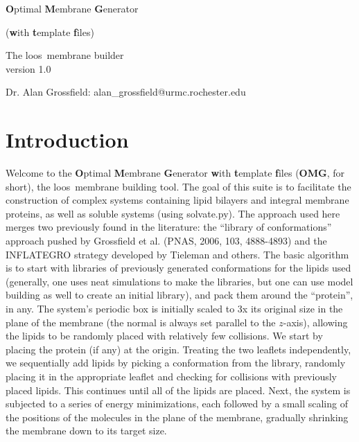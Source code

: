 \documentclass[12pt]{article}
\begin{document}
\newcommand{\loos}{{\sc loos}}
\newcommand{\pyloos}{{\sc PyLoos}}
\newcommand{\namd}{{\sc namd}}
\newcommand{\psfgen}{{\tt psfgen}}
\newcommand{\omgwtf}{{\bf OMG}}
\newcommand{\highlight}[1]{\textcolor{red}{#1}}


\begin{center}
\begin{LARGE}
{\bf O}ptimal {\bf M}embrane {\bf G}enerator \\
\end{LARGE}
\begin{Large}
({\bf w}ith  {\bf t}emplate {\bf f}iles) \\
\end{Large}
\vspace*{0.25in}
\begin{large}
The \loos\ membrane builder \\
version 1.0 \\
\end{large}

\vspace*{0.5in}
Dr. Alan Grossfield: alan\_grossfield@urmc.rochester.edu \\
\end{center}

\newpage

\tableofcontents
\newpage

\section{Introduction}
\label{s:intro}

Welcome to the {\bf O}ptimal {\bf M}embrane {\bf G}enerator {\bf w}ith {\bf
t}emplate {\bf f}iles (\omgwtf, for short), the \loos\ membrane building tool.
The goal of this suite is to facilitate the construction of complex systems
containing lipid bilayers and integral membrane proteins, as well as soluble
systems (using solvate.py).  The approach used here merges two previously found in the literature:
the ``library of conformations'' approach pushed by Grossfield et al. (PNAS,
2006, 103, 4888-4893) and the INFLATEGRO strategy developed by Tieleman and
others.  The basic algorithm is to start with libraries of previously generated
conformations for the lipids used (generally, one uses neat simulations to make
the libraries, but one can use model building as well to create an initial
library), and pack them around the ``protein'', in any.  The system's periodic
box is initially scaled to 3x its original size in the plane of the membrane
(the normal is always set parallel to the $z$-axis), allowing the lipids to be
randomly placed with relatively few collisions.  We start by placing the protein
(if any) at the origin. Treating the two leaflets independently, we sequentially
add lipids by picking a conformation from the library, randomly placing it in
the appropriate leaflet and checking for collisions with previously placed
lipids.  This continues until all of the lipids are placed.  Next, the system is
subjected to a series of energy minimizations, each followed by a small scaling
of the positions of the molecules in the plane of the membrane, gradually
shrinking the membrane down to its target size.
\end{document}
